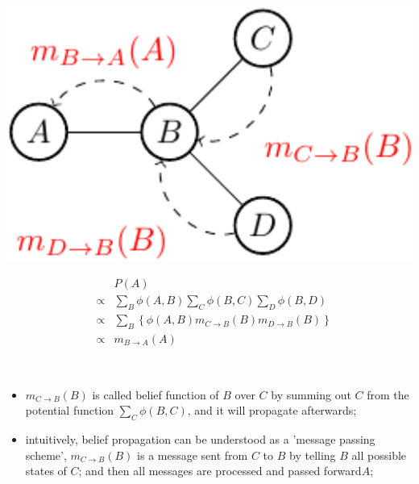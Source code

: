 \begin{minipage}[c]{0.4\textwidth}
      \centering
      \includegraphics[width=1.1\textwidth]{./Figures/message_passing_1}
\end{minipage}
\begin{minipage}[c]{0.6\textwidth}
 \begin{equation*}
  \begin{array}{rcl}
  & & P(A) \\
  &\propto& \sum_{B}\phi(A,B) \sum_C \phi(B,C) \sum_D \phi(B,D)\\ 
  &\propto& \sum_{B} \left\{\phi(A,B) m_{C\rightarrow B}(B) m_{D\rightarrow B}(B) \right\} \\
  &\propto& m_{B\rightarrow A}(A)
  \end{array}
 \end{equation*}
\end{minipage}\\

\begin{itemize}
 \item $m_{C\rightarrow B}(B)$ is called belief function of $B$ over $C$ by summing out $C$ from the potential function $\sum_C \phi(B,C)$, and it will propagate afterwards; 
 \item intuitively, belief propagation can be understood as a 'message passing scheme', $m_{C\rightarrow B}(B)$ is a message  sent from $C$ to $B$ by telling $B$ all possible states of $C$; and then 
 all messages are processed and passed forward$A$;
\end{itemize}


